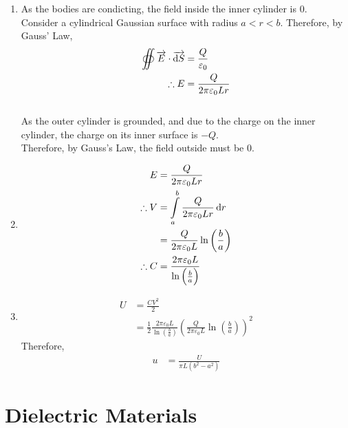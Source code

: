\documentclass[fleqn, a4paper, 12pt, twoside]{article}
\theoremstyle{definition}
\theoremstyle{theorem}
\begin{document}
\begin{solution}
	\begin{enumerate}[leftmargin=*]
		\item
			As the bodies are condicting, the field inside the inner cylinder is $0$.
			~\\
			Consider a cylindrical Gaussian surface with radius $a < r < b$.
			Therefore, by Gauss' Law,
			\begin{align*}
				\oiint \overrightarrow{E} \cdot \overrightarrow{\dif S} & = \frac{Q}{\varepsilon_0} \\
				\therefore E                                            & = \frac{Q}{2 \pi \varepsilon_0 L r}
			\end{align*}
			~\\
			As the outer cylinder is grounded, and due to the charge on the inner cylinder, the charge on its inner surface is $-Q$.\\
			Therefore, by Gauss's Law, the field outside must be $0$.
		\item
			\begin{align*}
				E &= \frac{Q}{2 \pi \varepsilon_0 L r}\\
				\therefore V &= \int\limits_{a}^{b} \frac{Q}{2 \pi \varepsilon_0 L r} \dif r\\
				&= \frac{Q}{2 \pi \varepsilon_0 L} \ln \left( \frac{b}{a} \right)\\
				\therefore C &= \frac{2 \pi \varepsilon_0 L}{\ln \left( \frac{b}{a} \right)}
			\end{align*}
		\item
			\begin{align*}
				U &= \frac{C V^2}{2}\\
				&= \frac{1}{2} \frac{2 \pi \varepsilon_0 L}{\ln \left( \frac{b}{a} \right)} \left( \frac{Q}{2 \pi \varepsilon_0 L} \ln \left( \frac{b}{a} \right) \right)^2
			\end{align*}
			Therefore,
			\begin{align*}
				u &= \frac{U}{\pi L (b^2 - a^2)}
			\end{align*}
	\end{enumerate}
\end{solution}

\section{Dielectric Materials}
\end{document}
